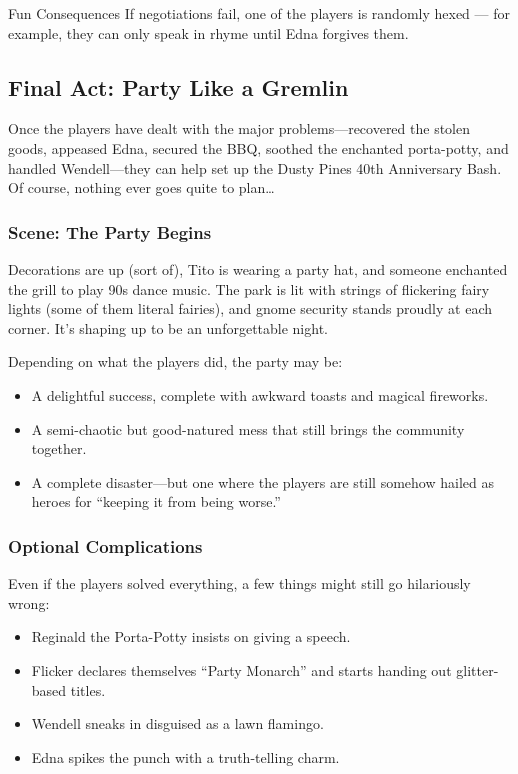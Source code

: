 \begin{CommentBox}{Fun Consequences}
    If negotiations fail, one of the players is randomly hexed — for example, they can only speak in rhyme until Edna forgives them.
\end{CommentBox}



\subsection{Final Act: Party Like a Gremlin}

Once the players have dealt with the major problems—recovered the stolen goods, appeased Edna, secured the BBQ, soothed the enchanted porta-potty, and handled Wendell—they can help set up the Dusty Pines 40th Anniversary Bash. Of course, nothing ever goes quite to plan…

\subsubsection{Scene: The Party Begins}

Decorations are up (sort of), Tito is wearing a party hat, and someone enchanted the grill to play 90s dance music. The park is lit with strings of flickering fairy lights (some of them literal fairies), and gnome security stands proudly at each corner. It’s shaping up to be an unforgettable night.

Depending on what the players did, the party may be:
\begin{itemize}
    \item A delightful success, complete with awkward toasts and magical fireworks.
    \item A semi-chaotic but good-natured mess that still brings the community together.
    \item A complete disaster—but one where the players are still somehow hailed as heroes for “keeping it from being worse.”
\end{itemize}

\subsubsection{Optional Complications}
Even if the players solved everything, a few things might still go hilariously wrong:
\begin{itemize}
    \item Reginald the Porta-Potty insists on giving a speech.
    \item Flicker declares themselves “Party Monarch” and starts handing out glitter-based titles.
    \item Wendell sneaks in disguised as a lawn flamingo.
    \item Edna spikes the punch with a truth-telling charm.
\end{itemize}

